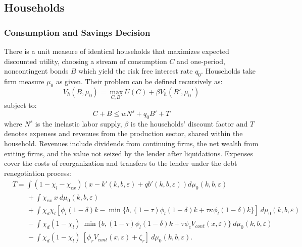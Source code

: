 \documentclass[12pt]{article}
\begin{document}
\subsection{Households}\label{sec:hh}
\subsubsection{Consumption and Savings Decision} \label{sec:Cons and Savings decision}
There is a unit measure of identical households that maximizes expected discounted utility, choosing a stream of consumption $C$ and one-period, noncontingent bonds $B$ which yield the risk free interest rate $q_0$. Households take firm measure $\mu_0$ as given. Their problem can be defined recursively as: 
\begin{equation} \label{eq:U_max}
V_h(B, \mu_0) = \max_{C,B'} U(C) + \beta V_h(B',\mu_0')
\end{equation}  
subject to: 
\begin{equation} \label{eq:const_hh}
C + B \leq w N^s + q_0 B' + T
\end{equation} 
where $N^s$ is the inelastic labor supply, $\beta$ is the households' discount factor and $T$ denotes expenses and revenues from the production sector, shared within the household. Revenues include dividends from continuing firms, the net wealth from exiting firms, and the value not seized by the lender after liquidations. Expenses cover the costs of reorganization and transfers to the lender under the debt renegotiation process:
\begin{equation*} \label{eq:T}
    \begin{split}
        & T = \int (1 - \chi_l - \chi_{ex}) \left( x - k'(k,b,\varepsilon) + qb'(k,b,\varepsilon) \right) d \mu_0(k,b,\varepsilon) \\
        & \qquad + \int \chi_{ex} \ x \ d \mu_0(k,b,\varepsilon) \\
        & \qquad + \int \chi_d \chi_{l} [ \phi_l (1-\delta) k -  \min\{b, (1-\tau) \phi_l (1-\delta) k +\tau \kappa \phi_l  (1-\delta) k \} ] \ d \mu_0(k,b,\varepsilon)  \\
        & \qquad  - \int \chi_d (1-\chi_{l}) \ \min\{b, (1-\tau) \phi_l (1-\delta) k +\tau \phi_c V_{cont} (x, \varepsilon)        \} \ d \mu_0(k,b,\varepsilon) \\
        & \qquad  - \int \chi_d (1-\chi_{l}) \  [ \phi_r V_{cont} (x, \varepsilon) + \zeta_r] \ d \mu_0(k,b,\varepsilon).
    \end{split}
\end{equation*}
\end{document}
